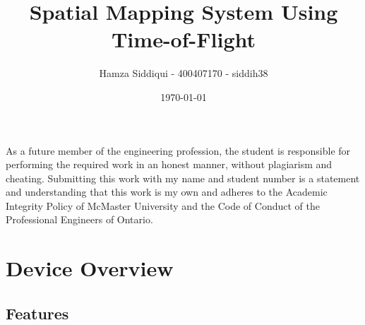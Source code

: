 \documentclass[12pt, letterpaper]{article}
\title{Spatial Mapping System Using Time-of-Flight}
\author{Hamza Siddiqui - 400407170 - siddih38 }
\date{\today}
\begin{document}
\maketitle
As a future member of the engineering profession, the student is responsible for performing the required work in an honest manner, without plagiarism and cheating.
Submitting this work with my name and student number is a statement and understanding that this work is my own and adheres to the Academic Integrity Policy of McMaster University and the Code of Conduct of the Professional Engineers of Ontario.
\thispagestyle{fancy}

\newpage
\section{Device Overview}
\subsection{Features}
\end{document}
